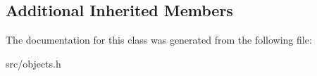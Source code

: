 \subsection*{Additional Inherited Members}


The documentation for this class was generated from the following file\+:\begin{DoxyCompactItemize}
\item 
src/objects.\+h\end{DoxyCompactItemize}

